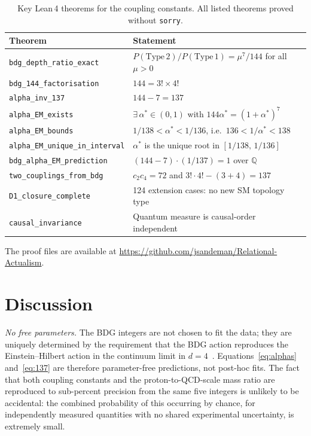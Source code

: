 \documentclass[11pt,twocolumn]{article}
\begin{document}
\begin{table}[t]
\centering
\caption{Key Lean\,4 theorems for the coupling constants.
  All listed theorems proved without \texttt{sorry}.}
\label{tab:lean}
\small
\begin{tabular}{ll}
\hline\hline
Theorem & Statement \\
\hline
\texttt{bdg\_depth\_ratio\_exact} & $P(\mathrm{Type\,2})/P(\mathrm{Type\,1}) = \mu^7/144$ for all $\mu>0$ \\
\texttt{bdg\_144\_factorisation} & $144 = 3!\times 4!$ \\
\texttt{alpha\_inv\_137} & $144 - 7 = 137$ \\
\texttt{alpha\_EM\_exists} & $\exists\,\alpha^*\!\in(0,1)$ with $144\alpha^* = (1{+}\alpha^*)^7$ \\
\texttt{alpha\_EM\_bounds} & $1/138 < \alpha^* < 1/136$, i.e.\ $136 < 1/\alpha^* < 138$ \\
\texttt{alpha\_EM\_unique\_in\_interval} & $\alpha^*$ is the unique root in $[1/138,\,1/136]$ \\
\texttt{bdg\_alpha\_EM\_prediction} & $(144{-}7)\cdot(1/137) = 1$ over $\mathbb{Q}$ \\
\texttt{two\_couplings\_from\_bdg} & $c_2 c_4 = 72$ and $3!\cdot 4!-(3{+}4) = 137$ \\
\texttt{D1\_closure\_complete} & 124 extension cases: no new SM topology type \\
\texttt{causal\_invariance} & Quantum measure is causal-order independent \\
\hline\hline
\end{tabular}
\normalsize
\end{table}

\noindent
The proof files are available at
\url{https://github.com/jsandeman/Relational-Actualism}.

\section{Discussion}

\smallskip\noindent\textit{No free parameters.}
The BDG integers are not chosen to fit the data; they are uniquely
determined by the requirement that the BDG action reproduces the
Einstein--Hilbert action in the continuum limit in $d=4$~\cite{Glaser2014}.
Equations~\eqref{eq:alphas} and~\eqref{eq:137} are therefore
parameter-free predictions, not post-hoc fits.
The fact that both coupling constants and the proton-to-QCD-scale mass
ratio are reproduced to sub-percent precision from the same five integers
is unlikely to be accidental: the combined probability of this occurring
by chance, for independently measured quantities with no shared
experimental uncertainty, is extremely small.
\end{document}
